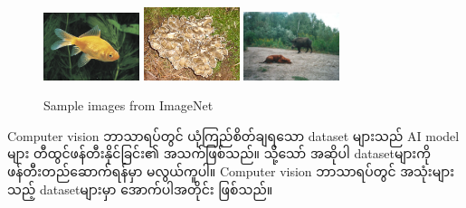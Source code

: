 \vspace{0.5em}
\begin{figure}[h]%
\centering
\includegraphics[width=0.25\textwidth]{imgs/imgnet_1.jpeg}
\includegraphics[width=0.25\textwidth]{imgs/imgnet_2.jpeg}
\includegraphics[width=0.25\textwidth]{imgs/imgnet_3.jpeg}
\caption{Sample images from ImageNet\cite{web:ILSVRC}}\label{fig:imgNet}
\end{figure}

Computer vision ဘာသာရပ်တွင် ယုံကြည်စိတ်ချရသော dataset များသည် AI model များ တီထွင်ဖန်တီးနိုင်ခြင်း၏ အသက်ဖြစ်သည်။ သို့သော် အဆိုပါ datasetများကို ဖန်တီးတည်ဆောက်ရန်မှာ မလွယ်ကူပါ။ Computer vision ဘာသာရပ်တွင် အသုံးများသည့် datasetများမှာ အောက်ပါအတိုင်း ဖြစ်သည်။ 

